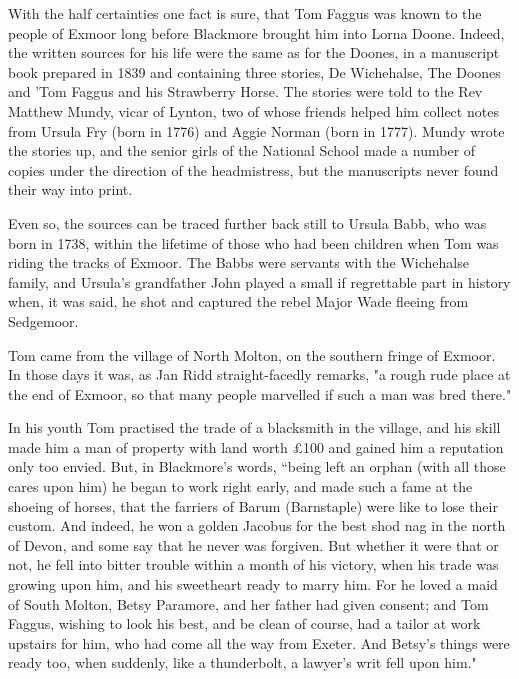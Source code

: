 With the half certainties one fact is sure, that Tom Faggus was known to the people of Exmoor long before Blackmore brought him into Lorna Doone. Indeed, the written sources for his life were the same as for the Doones, in a manuscript book prepared in 1839 and containing three stories, De Wichehalse, The Doones and 'Tom Faggus and his Strawberry Horse. The stories were told to the Rev Matthew Mundy, vicar of Lynton, two of whose friends helped him collect notes from Ursula Fry (born in 1776) and Aggie Norman (born in 1777). Mundy wrote the stories up, and the senior girls of the National School made a number of copies under the direction of the headmistress, but the manuscripts never found their way into print.

Even so, the sources can be traced further back still to Ursula Babb, who was born in 1738, within the lifetime of those who had been children when Tom was riding the tracks of Exmoor. The Babbs were servants with the Wichehalse family, and Ursula's grandfather John played a small if regrettable part in history when, it was said, he shot and captured the rebel Major Wade fleeing from Sedgemoor.

\Flourish
 
Tom came from the village of North Molton, on the southern fringe of Exmoor. In those days it was, as Jan Ridd straight-facedly remarks, "a rough rude place at the end of Exmoor, so that many people marvelled if such a man was bred there." 

In his youth Tom practised the trade of a blacksmith in the village, and his skill made him a man of property with land worth £100 and gained him a reputation only too envied. But, in Blackmore's words, “being left an orphan (with all those cares upon him) he began to work right early, and made such a fame at the shoeing of horses, that the farriers of Barum (Barnstaple) were like to lose their custom. And indeed, he won a golden Jacobus for the best shod nag in the north of Devon, and some say that he never was forgiven. But whether it were that or not, he fell into bitter trouble within a month of his victory, when his trade was growing upon him, and his sweetheart ready to marry him. For he loved a maid of South Molton, Betsy Paramore, and her father had given consent; and Tom Faggus, wishing to look his best, and be clean of course, had a tailor at work upstairs for him, who had come all the way from Exeter. And Betsy's things were ready too, when suddenly, like a thunderbolt, a lawyer's writ fell upon him."

